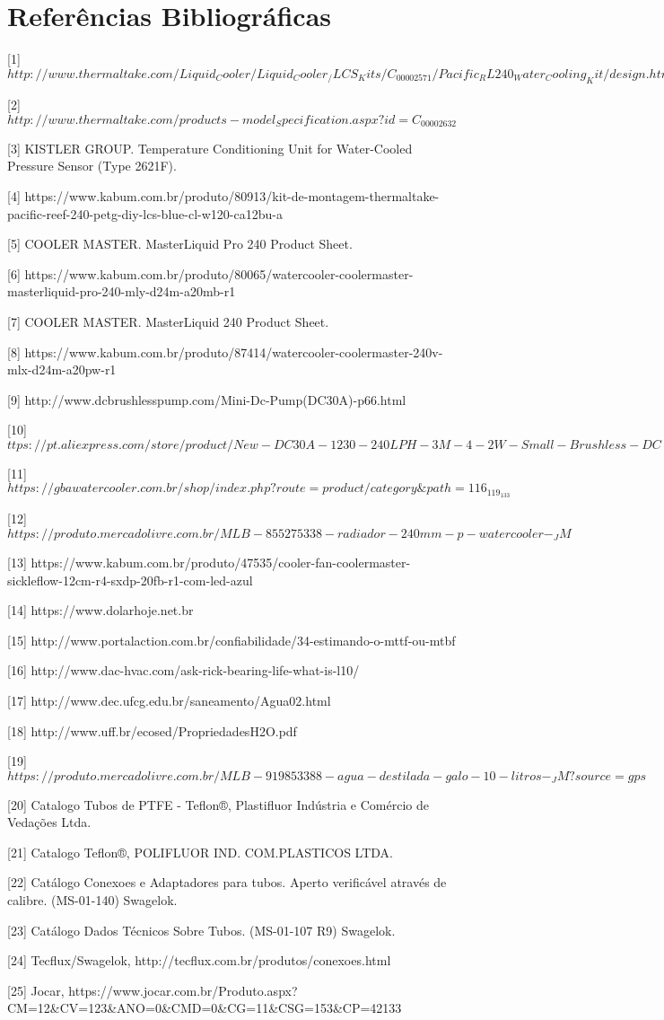 \chapter{Referências Bibliográficas}


[1] $http://www.thermaltake.com/Liquid_Cooler/Liquid_Cooler_/LCS_Kits/C_00002571/Pacific_RL240_Water_Cooling_Kit/design.htm$

[2] $http://www.thermaltake.com/products-model_Specification.aspx?id=C_00002632$

[3] KISTLER GROUP. Temperature Conditioning Unit for Water-Cooled Pressure Sensor (Type 2621F). 

[4] https://www.kabum.com.br/produto/80913/kit-de-montagem-thermaltake-pacific-reef-240-petg-diy-lcs-blue-cl-w120-ca12bu-a

[5] COOLER MASTER. MasterLiquid Pro 240 Product Sheet. 

[6] https://www.kabum.com.br/produto/80065/watercooler-coolermaster-masterliquid-pro-240-mly-d24m-a20mb-r1

[7] COOLER MASTER. MasterLiquid 240 Product Sheet. 

[8] https://www.kabum.com.br/produto/87414/watercooler-coolermaster-240v-mlx-d24m-a20pw-r1

[9] http://www.dcbrushlesspump.com/Mini-Dc-Pump(DC30A)-p66.html

[10] $ttps://pt.aliexpress.com/store/product/New-DC30A-1230-240LPH-3M-4-2W-Small-Brushless-DC-Water-Pump-
Waterproof-Submersible-For-Fountain/515403_32608819489.html$

[11] $https://gbawatercooler.com.br/shop/index.php?route=product/category\&path=116_119_133$

[12] $https://produto.mercadolivre.com.br/MLB-855275338-radiador-240mm-p-watercooler-_JM$

[13] https://www.kabum.com.br/produto/47535/cooler-fan-coolermaster-sickleflow-12cm-r4-sxdp-20fb-r1-com-led-azul

[14] https://www.dolarhoje.net.br

[15] http://www.portalaction.com.br/confiabilidade/34-estimando-o-mttf-ou-mtbf

[16] http://www.dac-hvac.com/ask-rick-bearing-life-what-is-l10/

[17] http://www.dec.ufcg.edu.br/saneamento/Agua02.html

[18] http://www.uff.br/ecosed/PropriedadesH2O.pdf

[19] $https://produto.mercadolivre.com.br/MLB-919853388-agua-destilada-galo-10-litros-_JM?source=gps$

[20] Catalogo Tubos de PTFE - Teflon®, Plastifluor Indústria e Comércio de Vedações Ltda.

[21] Catalogo Teflon®, POLIFLUOR IND. COM.PLASTICOS LTDA. 

[22] Catálogo Conexoes e Adaptadores para tubos. Aperto verificável através de calibre. (MS-01-140) Swagelok.

[23] Catálogo Dados Técnicos Sobre Tubos. (MS-01-107 R9) Swagelok.

[24] Tecflux/Swagelok, http://tecflux.com.br/produtos/conexoes.html

[25] Jocar, https://www.jocar.com.br/Produto.aspx?CM=12\&CV=123\&ANO=0\&CMD=0\&CG=11\&CSG=153\&CP=42133
